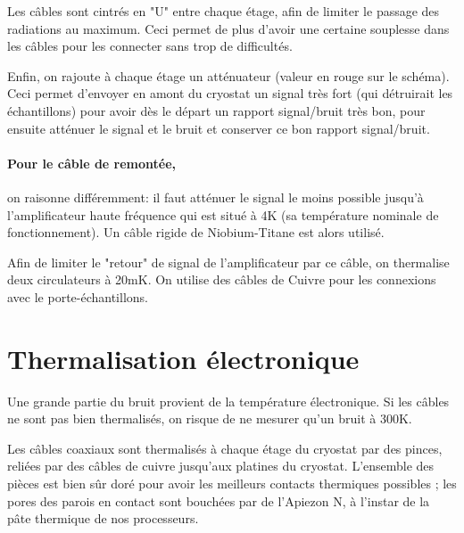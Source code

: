 Les câbles sont cintrés en "U" entre chaque étage, afin de limiter le passage des radiations au maximum. Ceci permet de plus d'avoir une certaine souplesse dans les câbles pour les connecter sans trop de difficultés.\newline

Enfin, on rajoute à chaque étage un atténuateur (valeur en rouge sur le schéma). Ceci permet d'envoyer en amont du cryostat un signal très fort (qui détruirait les échantillons) pour avoir dès le départ un rapport signal/bruit très bon, pour ensuite atténuer le signal et le bruit et conserver ce bon rapport signal/bruit.

\paragraph*{Pour le câble de remontée,}on raisonne différemment: il faut atténuer le signal le moins possible jusqu'à l'amplificateur haute fréquence qui est situé à 4K (sa température nominale de fonctionnement). Un câble rigide de Niobium-Titane est alors utilisé.

Afin de limiter le "retour" de signal de l'amplificateur par ce câble, on thermalise deux circulateurs à 20mK. On utilise des câbles de Cuivre pour les connexions avec le porte-échantillons.


\section{Thermalisation électronique}
Une grande partie du bruit provient de la température électronique. Si les câbles ne sont pas bien thermalisés, on risque de ne mesurer qu'un bruit à 300K.
\newline

Les câbles coaxiaux sont thermalisés à chaque étage du cryostat par des pinces, reliées par des câbles de cuivre jusqu'aux platines du cryostat. L'ensemble des pièces est bien sûr doré pour avoir les meilleurs contacts thermiques possibles ; les pores des parois en contact sont bouchées par de l'Apiezon N, à l'instar de la pâte thermique de nos processeurs.

